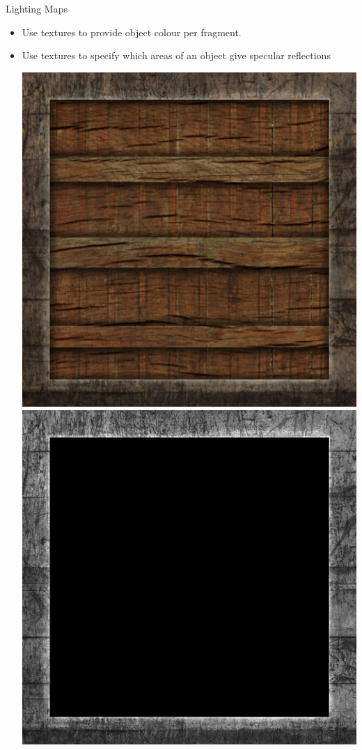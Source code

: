 \documentclass{beamer}
\begin{document}
\begin{frame}[fragile]{Lighting Maps}
    \begin{itemize}
        \item Use textures to provide object colour per fragment.
        \item Use textures to specify which areas of an object give specular reflections
              \begin{center}
                  \includegraphics[height=0.30\textheight]{images/container_diffuse.png}
                  \includegraphics[height=0.30\textheight]{images/container_specular.png}

\end{center}
\end{itemize}
\end{frame}
\end{document}
